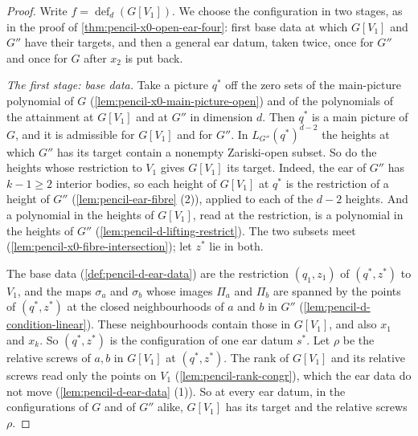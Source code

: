 \begin{proof}
  \leanok
  Write $f = \operatorname{def}_d(G[V_1])$. We choose the configuration
  in two stages, as in the proof of \cref{thm:pencil-x0-open-ear-four}:
  first base data at which $G[V_1]$ and $G''$ have their targets, and
  then a general ear datum, taken twice, once for $G''$ and once for $G$
  after $x_2$ is put back.

  \emph{The first stage: base data.} Take a picture $q^*$ off the zero
  sets of the main-picture polynomial of $G$
  (\cref{lem:pencil-x0-main-picture-open}) and of the polynomials of the
  attainment at $G[V_1]$ and at $G''$ in dimension $d$. Then $q^*$ is a
  main picture of $G$, and it is admissible for $G[V_1]$ and for $G''$.
  In $L_{G''}(q^*)^{d-2}$ the heights at which $G''$ has its target
  contain a nonempty Zariski-open subset. So do the heights whose
  restriction to $V_1$ gives $G[V_1]$ its target. Indeed, the ear of
  $G''$ has $k - 1 \ge 2$ interior bodies, so each height of $G[V_1]$ at
  $q^*$ is the restriction of a height of $G''$
  (\cref{lem:pencil-ear-fibre} (2)), applied to each of the $d - 2$
  heights. And a polynomial in the heights of $G[V_1]$, read at the
  restriction, is a polynomial in the heights of $G''$
  (\cref{lem:pencil-d-lifting-restrict}). The two subsets meet
  (\cref{lem:pencil-x0-fibre-intersection}); let $z^*$ lie in both.

  The base data (\cref{def:pencil-d-ear-data}) are the restriction
  $(q_1, z_1)$ of $(q^*, z^*)$ to $V_1$, and the maps $\sigma_a$ and
  $\sigma_b$ whose images $\Pi_a$ and $\Pi_b$ are spanned by the points
  of $(q^*, z^*)$ at the closed neighbourhoods of $a$ and $b$ in $G''$
  (\cref{lem:pencil-d-condition-linear}). These neighbourhoods contain
  those in $G[V_1]$, and also $x_1$ and $x_k$. So $(q^*, z^*)$ is the
  configuration of one ear datum $s^*$. Let $\rho$ be the relative screws
  of $a, b$ in $G[V_1]$ at $(q^*, z^*)$. The rank of $G[V_1]$ and its
  relative screws read only the points on $V_1$
  (\cref{lem:pencil-rank-congr}), which the ear data do not move
  (\cref{lem:pencil-d-ear-data} (1)). So at every ear datum, in the
  configurations of $G$ and of $G''$ alike, $G[V_1]$ has its target and
  the relative screws $\rho$.


\end{proof}
